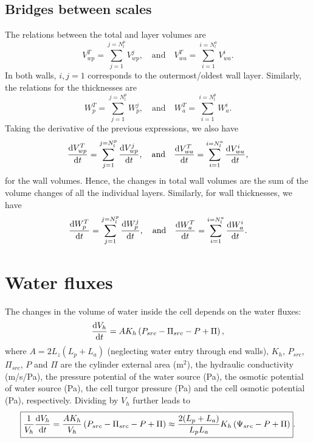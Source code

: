 \documentclass[]{article}
\begin{document}
\subsection{Bridges between scales}
The relations between the total and layer volumes are
\begin{equation}
	V_{wp}^T=\sum_{j=1}^{j=N_l^p}V_{wp}^j, 
	\quad\text{and}\quad
	V_{wa}^T=\sum_{i=1}^{i=N_l^a}V_{wa}^i.
\end{equation}
In both walls, $i,j=1$ corresponds to the outermost/oldest wall layer. Similarly, the relations for the thicknesses are
\begin{equation}
	W_{p}^T=\sum_{j=1}^{j=N_l^p}W_{p}^j, 
	\quad\text{and}\quad
	W_{a}^T=\sum_{i=1}^{i=N_l^p}W_{a}^i.
\end{equation}
Taking the derivative of the previous expressions, we also have
\begin{equation}
	\frac{{\rm d} V_{wp}^T}{{\rm d} t}=\sum_{j=1}^{j=N_l^p}\frac{{\rm d} V_{wp}^j}{{\rm d} t}, 
	\quad\text{and}\quad
	\frac{{\rm d} V_{wa}^T}{{\rm d} t}=\sum_{i=1}^{i=N_l^a}\frac{{\rm d} V_{wa}^i}{{\rm d} t},
\end{equation}
for the wall volumes. Hence, the changes in total wall volumes are the sum of the volume changes of all the individual layers. Similarly, for wall thicknesses, we have
\begin{equation}
	\frac{{\rm d} W_{p}^T}{{\rm d} t}=\sum_{j=1}^{j=N_l^p}\frac{{\rm d} W_{p}^j}{{\rm d} t}, 
	\quad\text{and}\quad
	\frac{{\rm d} W_{a}^T}{{\rm d} t}=\sum_{i=1}^{i=N_l^a}\frac{{\rm d} W_{a}^i}{{\rm d} t}.
\end{equation}
\section{Water fluxes}
The changes in the volume of water inside the cell depends on the water fluxes:
\begin{equation}
	\frac{{\rm d} V_h}{{\rm d} t}=AK_h\left(P_{src} - \Pi_{src} -P + \Pi \right),
\end{equation}
where $A=2L_z(L_p+L_a)$ (neglecting water entry through end walls), $K_h$, $P_{src}$, $\Pi_{src}$, $P$ and $\Pi$ are the cylinder external area (m$^2$), the hydraulic conductivity (m/s/Pa), the pressure potential of the water source (Pa), the osmotic potential of water source (Pa), the cell turgor pressure (Pa) and the cell osmotic potential (Pa), respectively.
Dividing by $V_h$ further leads to
\begin{equation}
	\boxed{
		\frac{1}{V_h}\frac{{\rm d} V_h}{{\rm d} t}=\frac{AK_h}{V_h}\left(P_{src} - \Pi_{src} -P + \Pi \right) \approx \frac{2(L_p+L_a)}{L_pL_a}K_h \left(\Psi_{src} -P + \Pi \right)}.
\end{equation}
\end{document}
